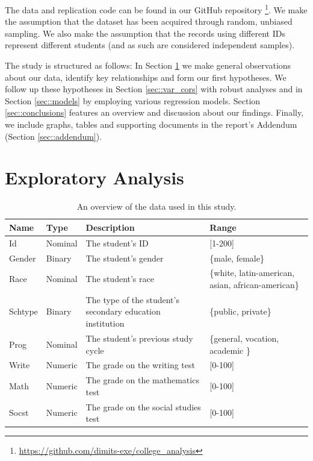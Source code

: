 \documentclass[10pt, a4paper]{article}
\begin{document}
	The data and replication code can be found in our GitHub repository \footnote{\url{https://github.com/dimits-exe/college_analysis}}. We make the assumption that the dataset has been acquired through random, unbiased sampling. We also make the assumption that the records using different IDs represent different students (and as such are considered independent samples).
	
	The study is structured as follows: In Section \ref{sec::exploratory} we make general observations about our data, identify key relationships and form our first hypotheses. We follow up these hypotheses in Section \ref{sec::var_cors} with robust analyses and in Section \ref{sec::models} by employing various regression models. Section \ref{sec::conclusions} features an overview and discussion about our findings. Finally, we include graphs, tables and supporting documents in the report's Addendum (Section \ref{sec::addendum}).
	
	
	\section{Exploratory Analysis}
	\label{sec::exploratory}
	
	\begin{table}
		\centering
		\begin{tabular}
			{ |p{1cm} p{1cm} p{5cm} p{3cm}| }
			\hline
			\textbf{Name} & \textbf{Type} & \textbf{Description} & \textbf{Range}\\
			\hline
			Id  & Nominal & The student's ID & [1-200] \\
			Gender  & Binary & The student's gender & \{male, female\} \\
			Race  & Nominal & The student's race & \{white, latin-american, asian, african-american\} \\
			Schtype  & Binary & The type of the student's secondary education institution & \{public, private\} \\
			Prog  & Nominal & The student's previous study cycle  & \{general, vocation, academic \} \\
			Write  & Numeric & The grade on the writing test  & [0-100] \\
			Math  & Numeric & The grade on the mathematics test  & [0-100] \\
			Socst  & Numeric & The grade on the social studies test & [0-100] \\
			\hline
		\end{tabular}
		\caption{An overview of the data used in this study.}
		\label{tab::dataset}
	\end{table}
	
\end{document}
